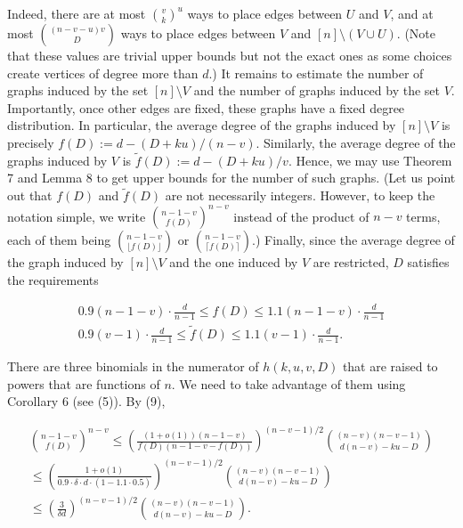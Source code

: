 \documentclass[10pt,a4paper]{article}
\begin{document}
Indeed, there are at most ${v\choose k}^{u}$ ways to place edges between $U$ and $V$, and at most ${(n-v-u)v\choose D}$ ways to place edges between $V$ and $[n]\setminus(V\cup U)$. (Note that these values are trivial upper bounds but not the exact ones as some choices create vertices of degree more than $d$.) It remains to estimate the number of graphs induced by the set $[n]\setminus V$ and the number of graphs induced by the set $V$. Importantly, once other edges are fixed, these graphs have a fixed degree distribution. In particular, the average degree of the graphs induced by $[n]\setminus V$ is precisely $f(D):=d-(D+ku)/(n-v)$. Similarly, the average degree of the graphs induced by $V$ is $\tilde{f}(D):=d-(D+ku)/v$. Hence, we may use Theorem 7 and Lemma 8 to get upper bounds for the number of such graphs. (Let us point out that $f(D)$ and $\tilde{f}(D)$ are not necessarily integers. However, to keep the notation simple, we write ${n-1-v\choose f(D)}^{n-v}$ instead of the product of $n-v$ terms, each of them being ${n-1-v\choose\lfloor f(D)\rfloor}$ or ${n-1-v\choose\lceil f(D)\rceil}$.) Finally, since the average degree of the graph induced by $[n]\setminus V$ and the one induced by $V$ are restricted, $D$ satisfies the requirements\par


\[\begin{gathered}
\displaystyle 0.9(n-1-v)\cdot\frac{d}{n-1}\leq \displaystyle f(D) \displaystyle\leq 1.1(n-1-v)\cdot\frac{d}{n-1} \\
\displaystyle 0.9(v-1)\cdot\frac{d}{n-1}\leq \displaystyle\tilde{f}(D) \displaystyle\leq 1.1(v-1)\cdot\frac{d}{n-1}.
\end{gathered}\]




There are three binomials in the numerator of $h(k,u,v,D)$ that are raised to powers that are functions of $n$. We need to take advantage of them using Corollary 6 (see (5)). By (9),\par


\[\begin{gathered}
\displaystyle{n-1-v\choose f(D)}^{n-v} \displaystyle\leq \displaystyle\left(\frac{(1+o(1))(n-1-v)}{f(D)(n-1-v-f(D))}\right)^{(n-v-1)/2}\binom{(n-v)(n-v-1)}{d(n-v)-ku-D} \\
\displaystyle\leq \displaystyle\left(\frac{1+o(1)}{0.9\cdot\delta\cdot d\cdot(1-1.1\cdot 0.5)}\right)^{(n-v-1)/2}\binom{(n-v)(n-v-1)}{d(n-v)-ku-D} \\
\displaystyle\leq \displaystyle\left(\frac{3}{\delta d}\right)^{(n-v-1)/2}\binom{(n-v)(n-v-1)}{d(n-v)-ku-D}.
\end{gathered}\]
\end{document}
